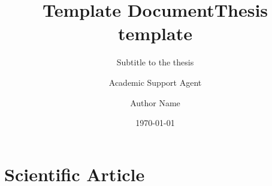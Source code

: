 \documentclass{article}
\title{Template Document}
\author{Academic Support Agent}
\date{\today}
\begin{document}
\maketitle

    \title{Thesis template}
    \subtitle{Subtitle to the thesis}
    \author{Author Name}
    \subject{Thesis Report}

    \makecover
    \afterpage{\blankpage}
    

    



    
    
    \printnomenclature
    
    

    



    \epigraphhead[650]{}
    \part{Scientific Article}
    \label{part:article}


    
    \thispagestyle{empty}
    
    
    \newpage

\end{document}
